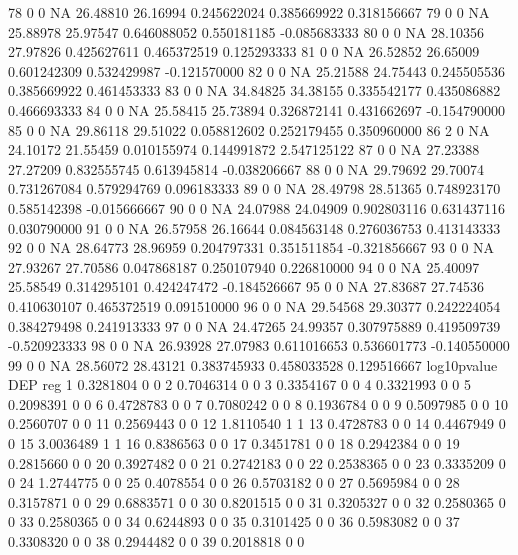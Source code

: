 \documentclass{beamer}
\begin{document}
\begin{frame}[fragile]
\begin{itemize}
\begin{Schunk}
\begin{Soutput}
78       0       0 NA 26.48810 26.16994 0.245622024 0.385669922  0.318156667
79       0       0 NA 25.88978 25.97547 0.646088052 0.550181185 -0.085683333
80       0       0 NA 28.10356 27.97826 0.425627611 0.465372519  0.125293333
81       0       0 NA 26.52852 26.65009 0.601242309 0.532429987 -0.121570000
82       0       0 NA 25.21588 24.75443 0.245505536 0.385669922  0.461453333
83       0       0 NA 34.84825 34.38155 0.335542177 0.435086882  0.466693333
84       0       0 NA 25.58415 25.73894 0.326872141 0.431662697 -0.154790000
85       0       0 NA 29.86118 29.51022 0.058812602 0.252179455  0.350960000
86       2       0 NA 24.10172 21.55459 0.010155974 0.144991872  2.547125122
87       0       0 NA 27.23388 27.27209 0.832555745 0.613945814 -0.038206667
88       0       0 NA 29.79692 29.70074 0.731267084 0.579294769  0.096183333
89       0       0 NA 28.49798 28.51365 0.748923170 0.585142398 -0.015666667
90       0       0 NA 24.07988 24.04909 0.902803116 0.631437116  0.030790000
91       0       0 NA 26.57958 26.16644 0.084563148 0.276036753  0.413143333
92       0       0 NA 28.64773 28.96959 0.204797331 0.351511854 -0.321856667
93       0       0 NA 27.93267 27.70586 0.047868187 0.250107940  0.226810000
94       0       0 NA 25.40097 25.58549 0.314295101 0.424247472 -0.184526667
95       0       0 NA 27.83687 27.74536 0.410630107 0.465372519  0.091510000
96       0       0 NA 29.54568 29.30377 0.242224054 0.384279498  0.241913333
97       0       0 NA 24.47265 24.99357 0.307975889 0.419509739 -0.520923333
98       0       0 NA 26.93928 27.07983 0.611016653 0.536601773 -0.140550000
99       0       0 NA 28.56072 28.43121 0.383745933 0.458033528  0.129516667
   log10pvalue DEP reg
1    0.3281804   0   0
2    0.7046314   0   0
3    0.3354167   0   0
4    0.3321993   0   0
5    0.2098391   0   0
6    0.4728783   0   0
7    0.7080242   0   0
8    0.1936784   0   0
9    0.5097985   0   0
10   0.2560707   0   0
11   0.2569443   0   0
12   1.8110540   1   1
13   0.4728783   0   0
14   0.4467949   0   0
15   3.0036489   1   1
16   0.8386563   0   0
17   0.3451781   0   0
18   0.2942384   0   0
19   0.2815660   0   0
20   0.3927482   0   0
21   0.2742183   0   0
22   0.2538365   0   0
23   0.3335209   0   0
24   1.2744775   0   0
25   0.4078554   0   0
26   0.5703182   0   0
27   0.5695984   0   0
28   0.3157871   0   0
29   0.6883571   0   0
30   0.8201515   0   0
31   0.3205327   0   0
32   0.2580365   0   0
33   0.2580365   0   0
34   0.6244893   0   0
35   0.3101425   0   0
36   0.5983082   0   0
37   0.3308320   0   0
38   0.2944482   0   0
39   0.2018818   0   0

\end{Soutput}
\end{Schunk}
\end{itemize}
\end{frame}
\end{document}
